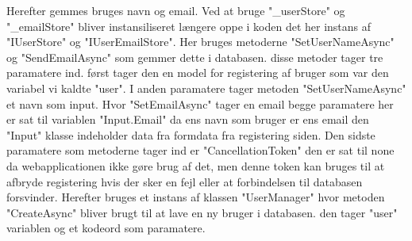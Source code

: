 Herefter gemmes bruges navn og email. Ved at bruge "\_userStore" og "\_emailStore" bliver instansiliseret længere oppe i koden det her instans af "IUserStore" og "IUserEmailStore".
Her bruges metoderne "SetUserNameAsync" og "SendEmailAsync" som gemmer dette i databasen. disse metoder tager tre paramatere ind. først tager
den en model for registering af bruger som var den variabel vi kaldte "user". I anden paramatere tager metoden "SetUserNameAsync" et navn som input.
Hvor "SetEmailAsync" tager en email begge paramatere her er sat til variablen "Input.Email" da ens navn som bruger er ens email den "Input" klasse indeholder data fra formdata fra registering siden. Den sidste paramatere som metoderne 
tager ind er "CancellationToken" den er sat til none da webapplicationen ikke gøre brug af det, men denne token kan bruges til at afbryde registering hvis der sker en fejl
eller at forbindelsen til databasen forsvinder. Herefter bruges et instans af klassen "UserManager" hvor metoden "CreateAsync" bliver
brugt til at lave en ny bruger i databasen. den tager "user" variablen og et kodeord som paramatere. 
\newpage

